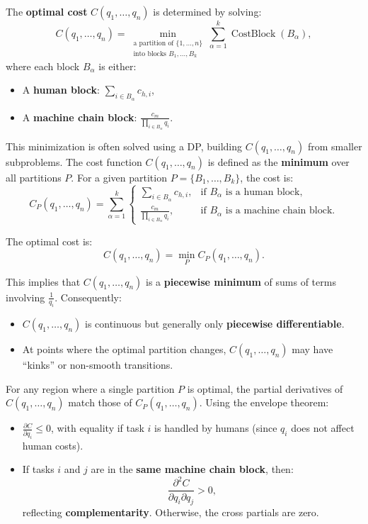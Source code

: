 \documentclass{article}
\DeclareMathOperator{\CostBlock}{CostBlock}
\begin{document}
The \textbf{optimal cost} \(C(q_1, \dots, q_n)\) is determined by solving:
\[
C(q_1, \dots, q_n) = \min_{\substack{\text{a partition of } \{1, \dots, n\} \\ \text{into blocks } B_1, \dots, B_k}} \sum_{\alpha=1}^k \CostBlock(B_\alpha),
\]
where each block \(B_\alpha\) is either:
\begin{itemize}
    \item A \textbf{human block}: \(\sum_{i \in B_\alpha} c_{h,i}\),
    \item A \textbf{machine chain block}: \(\frac{c_m}{\prod_{i \in B_\alpha} q_i}\).
\end{itemize}

This minimization is often solved using a DP, building \(C(q_1, \dots, q_n)\) from smaller subproblems.
The cost function \(C(q_1, \dots, q_n)\) is defined as the \textbf{minimum} over all partitions \(P\). For a given partition \(P = \{B_1, \dots, B_k\}\), the cost is:
\[
C_P(q_1, \dots, q_n) = \sum_{\alpha=1}^k
\begin{cases}
\sum_{i \in B_\alpha} c_{h,i}, & \text{if } B_\alpha \text{ is a human block}, \\[6pt]
\frac{c_m}{\prod_{i \in B_\alpha} q_i}, & \text{if } B_\alpha \text{ is a machine chain block}.
\end{cases}
\]

The optimal cost is:
\[
C(q_1, \dots, q_n) = \min_{P} C_P(q_1, \dots, q_n).
\]

This implies that \(C(q_1, \dots, q_n)\) is a \textbf{piecewise minimum} of sums of terms involving \(\frac{1}{q_i}\). Consequently:
\begin{itemize}
    \item \(C(q_1, \dots, q_n)\) is continuous but generally only \textbf{piecewise differentiable}.
    \item At points where the optimal partition changes, \(C(q_1, \dots, q_n)\) may have “kinks” or non-smooth transitions.
\end{itemize}

For any region where a single partition \(P\) is optimal, the partial derivatives of \(C(q_1, \dots, q_n)\) match those of \(C_P(q_1, \dots, q_n)\). Using the envelope theorem:
\begin{itemize}
    \item \(\frac{\partial C}{\partial q_i} \leq 0\), with equality if task \(i\) is handled by humans (since \(q_i\) does not affect human costs).
    \item If tasks \(i\) and \(j\) are in the \textbf{same machine chain block}, then:
    \[
    \frac{\partial^2 C}{\partial q_i \partial q_j} > 0,
    \]
    reflecting \textbf{complementarity}. Otherwise, the cross partials are zero.
\end{itemize}
\end{document}
